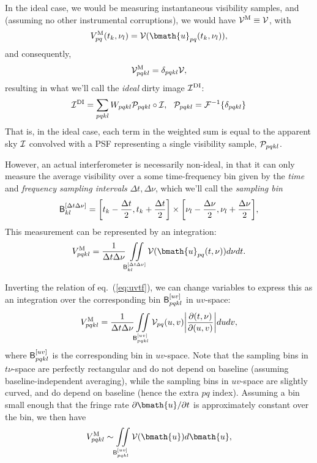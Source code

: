 \documentclass[useAMS,usenatbib]{mn2e}
\begin{document}
In the ideal case, we would be measuring instantaneous visibility samples, and (assuming no other instrumental corruptions), we would have $\mathcal{V}^\mathrm{M}\equiv\mathcal{V}$, with 
\begin{equation}
\Vm_{pq}(t_k,\nu_l)  = \VV(\bmath{u}_{pq}(t_k,\nu_l)),
\end{equation}
and consequently,
\begin{equation}
\label{eq:inst-sampled-visibility}
\mathcal{V}^\mathrm{M}_{pqkl} = \delta_{pqkl} \mathcal{V},
\end{equation}
resulting in what we'll call the \emph{ideal} dirty image 
$\mathcal{I}^\mathrm{DI}$:
\begin{equation}
\label{eq:imaging:DI}
\mathcal{I}^\mathrm{DI} =  \sum_{pqkl} W_{pqkl} \mathcal{P}_{pqkl} \circ \mathcal{I},~~\mathcal{P}_{pqkl}=\mathcal{F}^{-1}\{ \delta_{pqkl} \}
\end{equation}
That is, in the ideal case, each term in the weighted sum is equal to the apparent sky $\mathcal{I}$ convolved with a PSF representing a single visibility sample, $\mathcal{P}_{pqkl}$.

However, an actual interferometer is necessarily non-ideal, in that it can only measure the average visibility over a some time-frequency bin given by
the \emph{time} and \emph{frequency sampling intervals} $\Delta t,\Delta \nu$, which we'll call the \emph{sampling bin}
\begin{equation}
\mathsf{B}^{[\Delta t\Delta\nu]}_{kl} = \bigg [ t_k-\frac{\Delta t}{2},t_k+\frac{\Delta t}{2} \bigg ]
\times
\bigg [ \nu_l-\frac{\Delta\nu}{2},\nu_l+\frac{\Delta\nu}{2} \bigg ],  
\end{equation}
This measurement can be represented by an integration:
\begin{equation}
\Vm_{pqkl} = \frac{1}{\Delta t \Delta \nu} 
\iint\limits_{\Btf_{kl}}
\VV(\bmath{u}_{pq}(t,\nu))d\nu dt.
\label{eq2:conti}
\end{equation}

Inverting the relation of eq.~(\ref{eq:uvtf}), we can change variables to express this as an integration over the 
corresponding bin $\mathsf{B}^{[uv]}_{pqkl}$ in $uv$-space:
\begin{equation}
V^\mathrm{M}_{pqkl} = \frac{1}{\Delta t \Delta \nu} 
\iint\limits_{\mathsf{B}^{[uv]}_{pqkl}}
\mathcal{V}_{pq}(u,v)\bigg| \frac{\partial(t,\nu)}{\partial(u,v)}\bigg| dudv,
\label{eq2:conti:uv}
\end{equation}
where $\mathsf{B}^{[uv]}_{pqkl}$ is the corresponding bin in $uv$-space. Note that the sampling bins in $t\nu$-space are
perfectly rectangular and do not depend on baseline (assuming baseline-independent averaging), while the 
sampling bins in $uv$-space are slightly curved, and do depend on baseline (hence the extra $pq$ index). 
Assuming a bin small enough that the fringe rate $\partial\bmath{u}/\partial t$ is approximately constant over 
the bin, we then have \begin{equation}
\Vm_{pqkl} \sim \iint\limits_{\Buv_{pqkl}}
\VV (\bmath{u}) d\bmath{u},
\label{eq2:conti:uv1}
\end{equation}
\end{document}
